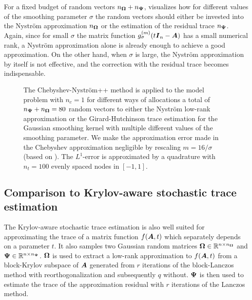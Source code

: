 For a fixed budget of random vectors $n_{\boldsymbol{\Omega}} + n_{\boldsymbol{\Psi}}$,  visualizes how for different values of the smoothing parameter $\sigma$ the random vectors should either be invested into the Nyström approximation $n_{\boldsymbol{\Omega}}$ or the estimation of the residual trace $n_{\boldsymbol{\Psi}}$. Again, since for small $\sigma$ the matrix function $g_{\sigma}^{(m)}(t \boldsymbol{I}_n - \boldsymbol{A})$ has a small numerical rank, a Nyström approximation alone is already enough to achieve a good approximation. On the other hand, when $\sigma$ is large, the Nyström approximation by itself is not effective, and the correction with the residual trace becomes indispensable.

\begin{figure}[ht]
    \centering
    
    \caption{The Chebyshev-Nyström++ method is applied to the model problem with $n_c = 1$ for different ways of allocations a total of $n_{\boldsymbol{\Psi}} + n_{\boldsymbol{\Omega}}=80$ random vectors to either the Nystr\"om low-rank approximation or the Girard-Hutchinson trace estimation for the Gaussian smoothing kernel with multiple different values of the smoothing parameter. We make the approximation error made in the Chebyshev approximation negligible by rescaling $m=16 / \sigma$ (based on ). The $L^1$-error is approximated by a quadrature with $n_t = 100$ evenly spaced nodes in $[-1, 1]$.}
    \label{fig:distribution}
\end{figure}

\subsection{Comparison to Krylov-aware stochastic trace estimation}
\label{subsec:krylov-aware}

The Krylov-aware stochastic trace estimation \cite{chen-2023-krylovaware-stochastic} is also well suited for approximating the trace of a matrix function $f(\boldsymbol{A}, t)$ which separately depends on a parameter $t$. It also samples two Gaussian random matrices $\boldsymbol{\Omega} \in \mathbb{R}^{n \times n_{\boldsymbol{\Omega}}}$ and $\boldsymbol{\Psi} \in \mathbb{R}^{n \times n_{\boldsymbol{\Psi}}}$. $\boldsymbol{\Omega}$ is used to extract a low-rank approximation to $f(\boldsymbol{A}, t)$ from a block-Krylov subspace of $\boldsymbol{A}$ generated from $r$ iterations of the block-Lanczos method with reorthogonalization and subsequently $q$ without. $\boldsymbol{\Psi}$ is then used to estimate the trace of the approximation residual with $r$ iterations of the Lanczos method.


